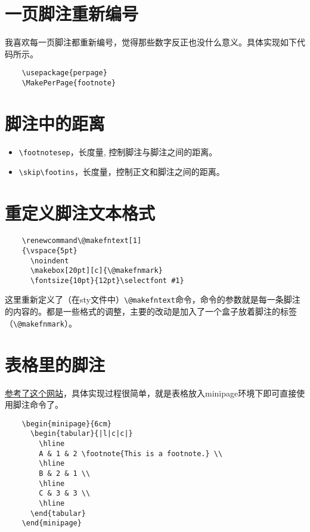 \documentclass[11pt,oneside]{book}
\begin{document}
  \section{一页脚注重新编号}
  我喜欢每一页脚注都重新编号，觉得那些数字反正也没什么意义。具体实现如下代码所示。
  \begin{Verbatim}
    \usepackage{perpage}
    \MakePerPage{footnote}
  \end{Verbatim}


  \section{脚注中的距离}
  \begin{itemize}
  \item \verb+\footnotesep+，长度量, 控制脚注与脚注之间的距离。
  \item \verb+\skip\footins+，长度量，控制正文和脚注之间的距离。
  \end{itemize}


  \section{重定义脚注文本格式}
  \begin{Verbatim}
    \renewcommand\@makefntext[1]
    {\vspace{5pt}
      \noindent
      \makebox[20pt][c]{\@makefnmark}
      \fontsize{10pt}{12pt}\selectfont #1}
  \end{Verbatim}

  这里重新定义了（在sty文件中）\verb+\@makefntext+命令，命令的参数就是每一条脚注的内容的。都是一些格式的调整，主要的改动是加入了一个盒子放着脚注的标签（\verb+\@makefnmark+）。


  \section{表格里的脚注}
  \href{http://texblog.org/tag/footnote/}{参考了这个网站}，具体实现过程很简单，就是表格放入minipage环境下即可直接使用脚注命令了。

  \begin{Verbatim}
    \begin{minipage}{6cm}
      \begin{tabular}{|l|c|c|}
		\hline
		A & 1 & 2 \footnote{This is a footnote.} \\
		\hline
		B & 2 & 1 \\
		\hline
		C & 3 & 3 \\
		\hline
      \end{tabular}
    \end{minipage}
  \end{Verbatim}
\end{document}
